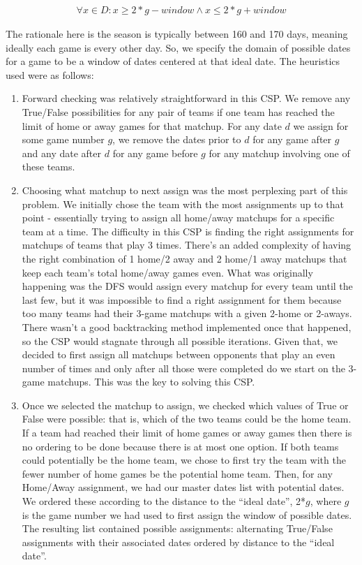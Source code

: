 \documentclass{article}
\begin{document}
	\begin{eqnarray*}
		\forall x \in D: x \geq 2*g- window \land x \leq 2*g + window
	\end{eqnarray*}

	The rationale here is the season is typically between 160 and 170 days, meaning ideally each game is every other day. So, we specify the domain of possible dates for a game to be a window of dates centered at that ideal date. The heuristics used were as follows:
	\begin{enumerate}
		\item Forward checking was relatively straightforward in this CSP. We remove any True/False possibilities for any pair of teams if one team has reached the limit of home or away games for that matchup. For any date $d$ we assign for some game number $g$, we remove the dates prior to $d$ for any game after $g$ and any date after $d$ for any game before $g$ for any matchup involving one of these teams.
		\item Choosing what matchup to next assign was the most perplexing part of this problem. We initially chose the team with the most assignments up to that point - essentially trying to assign all home/away matchups for a specific team at a time. The difficulty in this CSP is finding the right assignments for matchups of teams that play 3 times. There's an added complexity of having the right combination of 1 home/2 away and 2 home/1 away matchups that keep each team's total home/away games even. What was originally happening was the DFS would assign every matchup for every team until the last few, but it was impossible to find a right assignment for them because too many teams had their 3-game matchups with a given 2-home or 2-aways. There wasn't a good backtracking method implemented once that happened, so the CSP would stagnate through all possible iterations. Given that, we decided to first assign all matchups between opponents that play an even number of times and only after all those were completed do we start on the 3-game matchups. This was the key to solving this CSP.
		\item Once we selected the matchup to assign, we checked which values of True or False were possible: that is, which of the two teams could be the home team.  If a team had reached their limit of home games or away games then there is no ordering to be done because there is at most one option. If both teams could potentially be the home team, we chose to first try the team with the fewer number of home games be the potential home team. Then, for any Home/Away assignment, we had our master dates list with potential dates. We ordered these according to the distance to the ``ideal date'',  2*$g$, where $g$ is the game number we had used to first assign the window of possible dates. The resulting list contained possible assignments: alternating True/False assignments with their associated dates ordered by distance to the ``ideal date''.

\end{enumerate}
\end{document}
